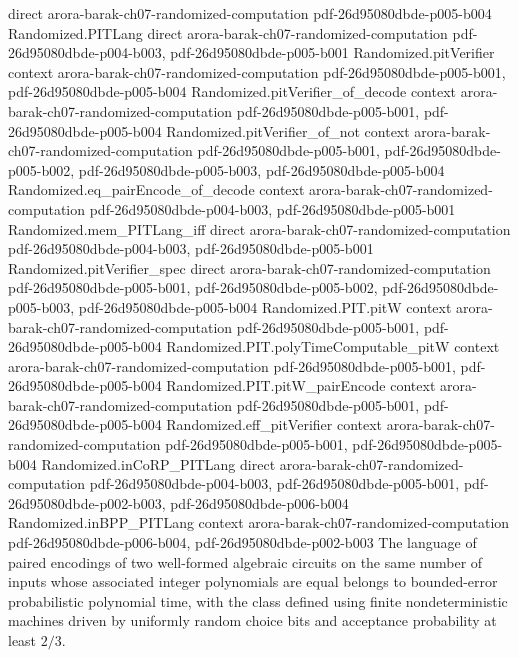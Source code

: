 \begin{theorem}
  {direct}
  {arora-barak-ch07-randomized-computation}
  {pdf-26d95080dbde-p005-b004}
\proofstep
  {Randomized.PITLang}
  {direct}
  {arora-barak-ch07-randomized-computation}
  {pdf-26d95080dbde-p004-b003,
    pdf-26d95080dbde-p005-b001}
\proofstep
  {Randomized.pitVerifier}
  {context}
  {arora-barak-ch07-randomized-computation}
  {pdf-26d95080dbde-p005-b001,
    pdf-26d95080dbde-p005-b004}
\proofstep
  {Randomized.pitVerifier_of_decode}
  {context}
  {arora-barak-ch07-randomized-computation}
  {pdf-26d95080dbde-p005-b001,
    pdf-26d95080dbde-p005-b004}
\proofstep
  {Randomized.pitVerifier_of_not}
  {context}
  {arora-barak-ch07-randomized-computation}
  {pdf-26d95080dbde-p005-b001,
    pdf-26d95080dbde-p005-b002,
    pdf-26d95080dbde-p005-b003,
    pdf-26d95080dbde-p005-b004}
\proofstep
  {Randomized.eq_pairEncode_of_decode}
  {context}
  {arora-barak-ch07-randomized-computation}
  {pdf-26d95080dbde-p004-b003,
    pdf-26d95080dbde-p005-b001}
\proofstep
  {Randomized.mem_PITLang_iff}
  {direct}
  {arora-barak-ch07-randomized-computation}
  {pdf-26d95080dbde-p004-b003,
    pdf-26d95080dbde-p005-b001}
\proofstep
  {Randomized.pitVerifier_spec}
  {direct}
  {arora-barak-ch07-randomized-computation}
  {pdf-26d95080dbde-p005-b001,
    pdf-26d95080dbde-p005-b002,
    pdf-26d95080dbde-p005-b003,
    pdf-26d95080dbde-p005-b004}
\proofstep
  {Randomized.PIT.pitW}
  {context}
  {arora-barak-ch07-randomized-computation}
  {pdf-26d95080dbde-p005-b001,
    pdf-26d95080dbde-p005-b004}
\proofstep
  {Randomized.PIT.polyTimeComputable_pitW}
  {context}
  {arora-barak-ch07-randomized-computation}
  {pdf-26d95080dbde-p005-b001,
    pdf-26d95080dbde-p005-b004}
\proofstep
  {Randomized.PIT.pitW_pairEncode}
  {context}
  {arora-barak-ch07-randomized-computation}
  {pdf-26d95080dbde-p005-b001,
    pdf-26d95080dbde-p005-b004}
\proofstep
  {Randomized.eff_pitVerifier}
  {context}
  {arora-barak-ch07-randomized-computation}
  {pdf-26d95080dbde-p005-b001,
    pdf-26d95080dbde-p005-b004}
\proofstep
  {Randomized.inCoRP_PITLang}
  {direct}
  {arora-barak-ch07-randomized-computation}
  {pdf-26d95080dbde-p004-b003,
    pdf-26d95080dbde-p005-b001,
    pdf-26d95080dbde-p002-b003,
    pdf-26d95080dbde-p006-b004}
\proofstep
  {Randomized.inBPP_PITLang}
  {context}
  {arora-barak-ch07-randomized-computation}
  {pdf-26d95080dbde-p006-b004,
    pdf-26d95080dbde-p002-b003}
The language of paired encodings of two well-formed algebraic circuits on the same
number of inputs whose associated integer polynomials are equal belongs to bounded-error
probabilistic polynomial time, with the class defined using finite nondeterministic
machines driven by uniformly random choice bits and acceptance probability at least
$2/3$.
\end{theorem}
